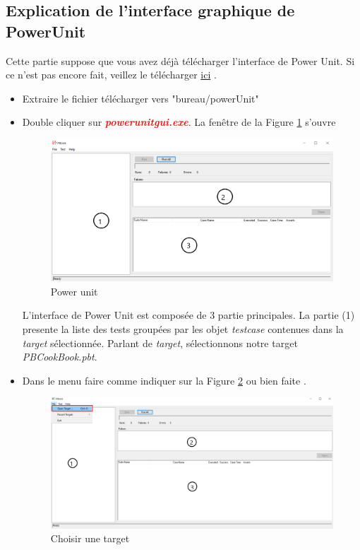 \documentclass[french]{article}
\theoremstyle{definition}
\begin{document}
\subsection{Explication de l'interface graphique de PowerUnit}
Cette partie suppose que vous avez déjà télécharger l'interface de Power  Unit. Si ce n'est pas encore fait, veillez le télécharger \href{https://github.com/mahugnon/PowerUnitHonore/releases/download/v3.1.2/powerUnit.zip}{ici} .
\begin{itemize}
    \item  Extraire le  fichier télécharger  vers "bureau/powerUnit"
    \item  Double cliquer sur \textbf{\textit{\textcolor{red}{powerunitgui.exe}}}. 
    La fenêtre de la Figure \ref{fig:emptyPowerUnit} s'ouvre
    \begin{figure}[!htbp]
        \begin{center}
        \includegraphics[width=1\linewidth]{./emptyPowerUnit.png}
        \caption{Power unit}
        \label{fig:emptyPowerUnit}
        \end{center}
      \end{figure}
   L'interface de Power Unit est composée de 3 partie principales.
 La partie (1) presente la liste des tests groupées par les objet \textit{testcase}  contenues dans la \textit{target} sélectionnée.
Parlant de \textit{target}, sélectionnons notre target \textit{PBCookBook.pbt}.
\item  Dans le menu faire  comme indiquer sur la Figure \ref{fig:openTarget} ou bien faite .

\begin{figure}[!htbp]
    \begin{center}
    \includegraphics[width=1\linewidth]{./openTarget.png}
    \caption{Choisir une target}
    \label{fig:openTarget}
    \end{center}
  \end{figure}


\end{itemize}
\end{document}
